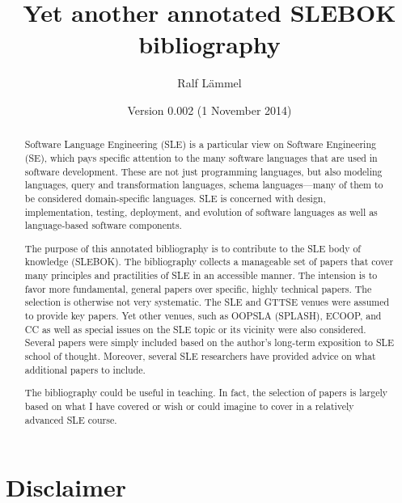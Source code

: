 \documentclass[12pt]{article}
\title{Yet another annotated SLEBOK bibliography}
\author{Ralf L\"ammel}
\date{Version 0.002 (1 November 2014)}
\begin{document}
\maketitle


\begin{abstract}

  Software Language Engineering (SLE) is a particular view on Software
  Engineering (SE), which pays specific attention to the many software
  languages that are used in software development. These are not just
  programming languages, but also modeling languages, query and
  transformation languages, schema languages---many of them to be
  considered domain-specific languages. SLE is concerned with design,
  implementation, testing, deployment, and evolution of software
  languages as well as language-based software components.

  \medskip

  The purpose of this annotated bibliography is to contribute to the
  SLE body of knowledge (SLEBOK). The bibliography collects a
  manageable set of papers that cover many principles and practilities
  of SLE in an accessible manner. The intension is to favor more
  fundamental, general papers over specific, highly technical papers.
  The selection is otherwise not very systematic. The SLE and GTTSE
  venues were assumed to provide key papers. Yet other venues, such as
  OOPSLA (SPLASH), ECOOP, and CC as well as special issues on the SLE
  topic or its vicinity were also considered. Several papers were
  simply included based on the author's long-term exposition to SLE
  school of thought. Moreover, several SLE researchers have provided
  advice on what additional papers to include.

  \medskip 

  The bibliography could be useful in teaching. In fact, the selection
  of papers is largely based on what I have covered or wish or could
  imagine to cover in a relatively advanced SLE course.

\end{abstract}


\newpage

\tableofcontents


\newpage

\section{Disclaimer}
\end{document}
